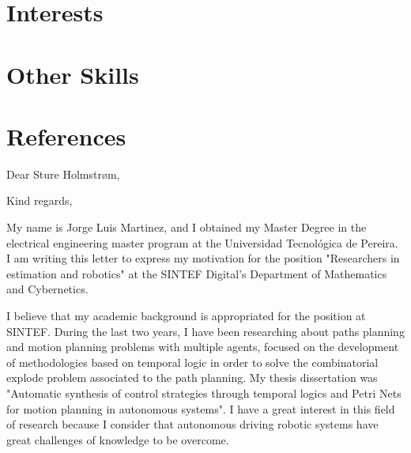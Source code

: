 \documentclass[11pt,a4paper,sans,english]{moderncv}        %
\begin{document}
\section{Interests}
\section{Other Skills}
\section{References}
\begin{cvcolumns}
\end{cvcolumns}
\clearpage
\date{February 14, 2019}
\opening{Dear Sture Holmstrøm,}
\closing{Kind regards,}
\makelettertitle
My name is Jorge Luis Martinez, and I obtained my Master Degree in the electrical engineering master program at the Universidad Tecnológica de Pereira. I am writing this letter to express my motivation for the position "Researchers in estimation and robotics" at the SINTEF Digital's Department of Mathematics and Cybernetics.

I believe that my academic background is appropriated for the position at SINTEF. During the last two years, I have been researching about paths planning and motion planning problems with multiple agents, focused on the development of methodologies based on temporal logic in order to solve the combinatorial explode problem associated to the path planning. My thesis dissertation was "Automatic synthesis of control strategies through temporal logics and Petri Nets for motion planning in autonomous systems". I have a great interest in this field of research because I consider that autonomous driving robotic systems have great challenges of knowledge to be overcome.
\end{document}

